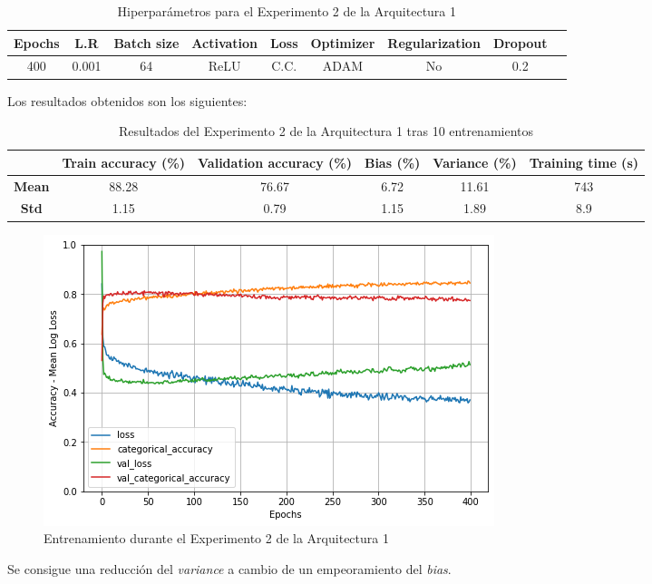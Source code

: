 \documentclass{article}
\begin{document}
            \begin{table}[!h]
				\begin{tabular}{|c|c|c|c|c|c|c|c|c|}
					\textbf{Epochs}&\textbf{L.R}&\textbf{Batch size}&\textbf{Activation}&\textbf{Loss}&\textbf{Optimizer}&\textbf{Regularization}&\textbf{Dropout}   \\ \hline
					400 & 0.001 & 64 & ReLU & C.C. & ADAM & No & 0.2 
				\end{tabular}
				\caption{Hiperpar\'ametros para el Experimento 2 de la Arquitectura 1}
				\label{tab:hip-a6-e2}
			\end{table}
   
            Los resultados obtenidos son los siguientes: 
            \begin{table}[!h]
				\begin{center}
					\begin{tabular}{ c | c | c | c | c | c |}
						\ & \textbf{Train accuracy (\%)} & \textbf{Validation accuracy (\%)} & \textbf{Bias (\%)} & \textbf{Variance (\%)} & \textbf{Training time (s)} \\ \hline
						\textbf{Mean} & 88.28  & 76.67 & 6.72 & 11.61 & 743  \\ \hline
						\textbf{Std} & 1.15  & 0.79 & 1.15 & 1.89 & 8.9  \\ \hline
					\end{tabular}
					\caption{Resultados del Experimento 2 de la Arquitectura 1 tras 10 entrenamientos}
					\label{tab:res-a2-e5}
				\end{center}
			\end{table}
			
            \begin{figure}[!h]
				\begin{center}
					\includegraphics[scale=0.5]{tr-a6-e2.png}		
					\caption{Entrenamiento durante el Experimento 2 de la Arquitectura 1}	
					\label{tab:tr-a6-e2}
				\end{center}
			\end{figure}
            Se consigue una reducci\'on del \textit{variance} a cambio de un empeoramiento del \textit{bias}. 
        
\end{document}
